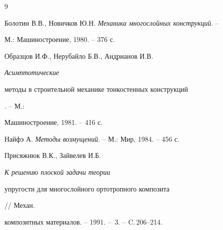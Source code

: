 


 


\begin{thebibliography}{9} 


 




Болотин В.В., Новичков Ю.Н. {\em Механика многослойных конструкций}. -- 


М.: Машиностроение, 1980. -- 376 с. 




Образцов И.Ф., Нерубайло Б.В., Андрианов И.В. {\em Асимптотические 


методы в строительной механике тонкостенных конструкций}. -- М.: 


Машиностроение, 1981. -- 416 с. 




Найфэ А. {\em Методы возмущений}. -- М.: Мир, 1984. -- 456 с. 




Присяжнюк В.К., Зайвелев И.Б. {\em К решению плоской задачи теории 


упругости для многослойного ортотропного композита} // Механ. 


композитных материалов. -- 1991. -- \No\,3. -- C.\,206--214. 


\end{thebibliography} 


 


\vskip 2cm 


 






 


\label{end} 


 


